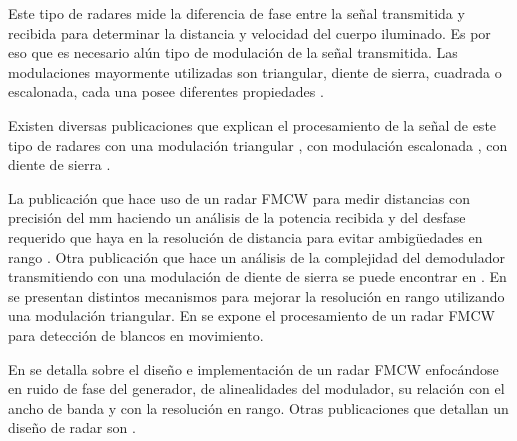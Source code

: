 Este tipo de radares mide la diferencia de fase entre la señal transmitida y recibida para determinar la distancia y velocidad del cuerpo iluminado. Es por eso que es necesario alún tipo de modulación de la señal transmitida. Las modulaciones mayormente utilizadas son triangular, diente de sierra, cuadrada o escalonada, cada una posee diferentes propiedades \cite{Basics2015}.

Existen diversas publicaciones que explican el procesamiento de la señal de este tipo de radares con una modulación triangular \cite{Chang2006}, con modulación escalonada \cite{steppedFreq}, con diente de sierra \cite{Shen, Varavin2007a}. 

La publicación que hace uso de un radar FMCW para medir distancias con precisión del $\si{\milli\meter}$ haciendo un análisis de la potencia recibida y del desfase requerido que haya en la resolución de distancia para evitar ambigüedades en rango \cite{Brennan2014a}. Otra publicación que hace un análisis de la complejidad del demodulador transmitiendo con una modulación de diente de sierra se puede encontrar en \cite{Shen}. En \cite{Kurt2007} se presentan distintos mecanismos para mejorar la resolución en rango utilizando una modulación triangular. En \cite{Lipa1990} se expone el procesamiento de un radar FMCW para detección de blancos en movimiento.

En \cite{Brooker2005} se detalla sobre el diseño e implementación de un radar FMCW enfocándose en ruido de fase del generador, de alinealidades del modulador, su relación con el ancho de banda y con la resolución en rango. Otras publicaciones que detallan un diseño de radar son \cite{Chan2009, Wavemaker2015}. 
